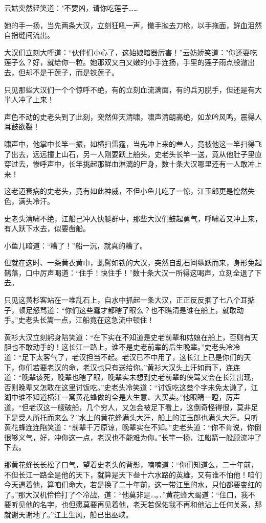 \documentclass[12pt,oneside]{book}
\begin{document}
云姑突然轻笑道："不要凶，请你吃莲子\ldots\ldots{}

她的手一扬，当先两条大汉，立刻狂吼一声，撤手抛去刀枪，以手拖面，鲜血泪然自指缝间流出。

大汉们立刻大呼道：``伙伴们小心了，这始娘暗器厉害！''云妨娇笑道："你还耍吃莲子么？好，就给你一粒。她那双又白又嫩的小手连扬，手里的莲子雨点般澈出去，但却不是干莲子，而是铁莲子。

只见那些大汉们一个个惊呼不绝，有的立刻血流满面，有的兵刃脱手，但还是有大半人冲了上来！

声色不动的史老头到了此刻，突然仰天清啸，啸声清朗高绝，如龙吟风鸣，震得人耳鼓欲裂！

啸声中，他掌中长竿一振，如横扫雷霆，当先冲上来的叁人，竟被他这一竿扫得飞了出去，远远撞上山石，另一人刚要跃上船头，史老头长竿一送，竟从他肚子里直穿过去，惨呼声中，长竿挑起那鲜血淋漓的尸身，数十条大汉哪里还有一人敢冲上来！

这老迈衰病的史老头，竟有如此神威，不但小鱼儿吃了一惊，江玉郎更是惶然失色，满头冷汗。

史老头清啸不绝，江船己冲入快艇群中，那些大汉们鼓起勇气，呼啸着又冲上来，有人跃下水去，似要凿船。

小鱼儿暗道：``糟了！''船一沉，就真的糟了。

但就在这时、一条黄衣黄巾，虬髯如铁的大汉，突然自乱石间纵跃而来，身形兔起鹊落，口中厉声喝道：``住手！快住手！''数十条大汉一所得这喝声，立刻全退了下去。

只见这黄杉客站在一堆乱石上，自水中抓起一条大汉，正正反反掴了七八个耳掂子，顿足怒骂道：``你们这些蠢才都瞎了眼么？也不瞧清是谁在船上，就敢动手。''史老头长篙一点，江船竟在这急流中顿住！

黄衫大汉立刻躬身陪笑道：``在下实在不知道是史老前辈和姑娘在船上，否则有天胆也不敢动手的！这长江一路上，谁不是史老前辈的后生晚辈。''史老头冷冷道：``足下太客气了，老汉担当不起。老汉已不中用了，这长江上已是你们的天下，你们若要老汉的命，老汉也只有送给你。''黄衫大汉头上汗如雨下，连连道：``晚辈该死，晚辈也瞎了眼，晚辈实未想到史老前辈的侠驾又会在长江出现，否则晚辈又怎敢在这里讨饭吃。''史老头冷笑道：``讨饭吃这叁个字未免太谦了，江湖中谁不知道横江一窝黄花蜂做的全是大生意、大买卖。''他眼睛一瞪，厉声道，``但老汉这一艘破船，几个穷人，又怎会被足下看上，这倒奇怪得很，莫非足下是受人所托而来么？''水上的黄花蜂满头大汗，船上的江玉郎也满头大汗。只听黄花蜂连连陷笑道：``前辈千万原谅，晚辈实在不知。''史老头道：``你不肯说，你倒很够义气，好，冲你这一点，老汉也不能难为你。''长竿一扬，江船箭一般顾流冲了下去。

那黄花蜂长长松了口气，望着史老头的背影，喃喃道：``你们知道么，二十年前，不但长江一路全是他的天下，就算是天下叁十六水路的英雄，又有谁不怕他！咱们今天遇着他，算咱们命大，若是换了二十年前，这一带江里的水，只怕都要变红的了。''那大汉机伶伶打了个冷战，道：``他莫非是\ldots。．''黄花蜂大蝎道：``住口，我不要听见他的名字，也但愿莫要再见着他，老天若保佑我不再和他沾上任何关系，那就谢天谢地了。''江上生风，船已出巫峡。
\end{document}
